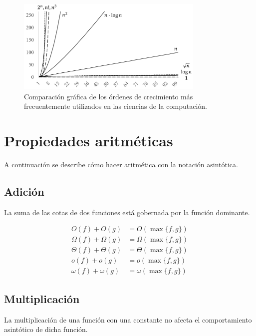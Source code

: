 \begin{figure}[tb]
\begin{centering}
\includegraphics[width=0.8\textwidth]{01-algoritmos-secuenciales/figuras/ordenes}
\par\end{centering}
\caption{{\small{}Comparación gráfica de los órdenes de crecimiento más frecuentemente
utilizados en las ciencias de la computación.}}
\end{figure}


\section{Propiedades aritméticas}

A continuación se describe cómo hacer aritmética con la notación asintótica.

\subsection{Adición}

La suma de las cotas de dos funciones está gobernada por la función
dominante.

\[
\begin{aligned}O(f)+O(g) & =O(\max\{f,g\})\\
\Omega(f)+\Omega(g) & =\Omega(\max\{f,g\})\\
\Theta(f)+\Theta(g) & =\Theta(\max\{f,g\})\\
o(f)+o(g) & =o(\max\{f,g\})\\
\omega(f)+\omega(g) & =\omega(\max\{f,g\})
\end{aligned}
\]


\subsection{Multiplicación}

La multiplicación de una función con una constante no afecta el comportamiento
asintótico de dicha función.

